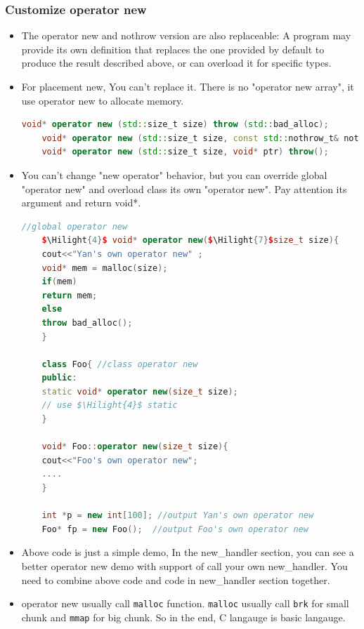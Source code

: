 \documentclass[a4paper,12pt,twoside]{book}
\newcommand{\Hilight}[1]{\makebox[0pt][l]{\color{yellow}\rule[-3pt]{#1em}{11pt}}}
\begin{document}
\subsubsection{Customize operator new}
\begin{itemize}
	\item The operator new and nothrow version are also replaceable: A program may provide its own definition that replaces the one provided by default to produce the result described above, or can overload it for specific types. 
	\item For placement new, You can't replace it. There is no "operator new array", it use operator new to allocate memory. 
	\begin{lstlisting}[frame=single, language=c++]
	void* operator new (std::size_t size) throw (std::bad_alloc);
	void* operator new (std::size_t size, const std::nothrow_t& nothrow_value) throw();
	void* operator new (std::size_t size, void* ptr) throw();
	\end{lstlisting}
	
	\item You can't change "new operator" behavior, but you can override global "operator new" and overload class its own "operator new". Pay attention its argument and return void*. 
	
	\begin{lstlisting}[frame=single, language=c++, mathescape=true]
	//global operator new
	$\Hilight{4}$ void* operator new($\Hilight{7}$size_t size){
	cout<<"Yan's own operator new" ;
	void* mem = malloc(size);
	if(mem)
	return mem;
	else
	throw bad_alloc();
	}
	
	class Foo{ //class operator new
	public:
	static void* operator new(size_t size);
	// use $\Hilight{4}$ static
	}
	
	void* Foo::operator new(size_t size){
	cout<<"Foo's own operator new";
	....
	}
	
	int *p = new int[100]; //output Yan's own operator new
	Foo* fp = new Foo();  //output Foo's own operator new
	\end{lstlisting}
	
	\item Above code is just a simple demo, In the new\_handler section, you can see a better operator new demo with support of call your own new\_handler. You need to combine above code and code in new\_handler section together. 
	
	\item operator new usually call \texttt{malloc} function. \texttt{malloc} usually call \texttt{brk} for small chunk and \texttt{mmap} for big chunk. So in the end, C langauge is basic langauge.
	

\end{itemize}
\end{document}
